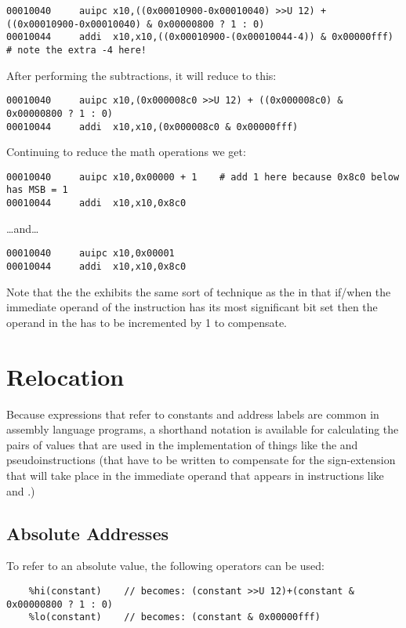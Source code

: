 {\small
\begin{verbatim}
00010040     auipc x10,((0x00010900-0x00010040) >>U 12) + ((0x00010900-0x00010040) & 0x00000800 ? 1 : 0)
00010044     addi  x10,x10,((0x00010900-(0x00010044-4)) & 0x00000fff)      # note the extra -4 here!
\end{verbatim}
}
After performing the subtractions, it will reduce to this:
{\small
\begin{verbatim}
00010040     auipc x10,(0x000008c0 >>U 12) + ((0x000008c0) & 0x00000800 ? 1 : 0)
00010044     addi  x10,x10,(0x000008c0 & 0x00000fff)
\end{verbatim}
}
Continuing to reduce the math operations we get:
{\small
\begin{verbatim}
00010040     auipc x10,0x00000 + 1    # add 1 here because 0x8c0 below has MSB = 1
00010044     addi  x10,x10,0x8c0
\end{verbatim}
}

\ldots and\ldots

{\small
\begin{verbatim}
00010040     auipc x10,0x00001
00010044     addi  x10,x10,0x8c0
\end{verbatim}
}

Note that the the \verb@la@ exhibits the same sort of technique as the \verb@li@ in that
if/when the immediate operand of the \verb@addi@ instruction has its most significant 
bit set then the operand in the \verb@auipc@ has to be incremented by 1 to compensate.



\section{Relocation}
 
Because expressions that refer to constants and address labels are common in 
assembly language programs, a shorthand notation is available for calculating 
the pairs of values that are used in the implementation of things like the 
\verb@li@ and \verb@la@ pseudoinstructions (that have to be written to 
compensate for the sign-extension that will take place in the immediate operand 
that appears in instructions like \verb@addi@ and \verb@jalr@.)

\subsection{Absolute Addresses}

To refer to an absolute value, the following operators can be used:
{\small
\begin{verbatim}
    %hi(constant)    // becomes: (constant >>U 12)+(constant & 0x00000800 ? 1 : 0)
    %lo(constant)    // becomes: (constant & 0x00000fff)
\end{verbatim}
}

